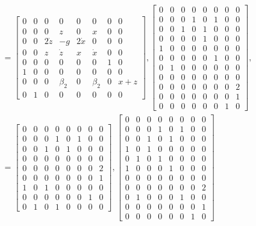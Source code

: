 \documentclass[12pt]{article}
\begin{document}
\begin{align*}
    &= 
    \left[\begin{matrix}0 & 0 & 0 & 0 & 0 & 0 & 0 & 0\\0 & 0 & 0 & z & 0 & x & 0 & 0\\0 & 0 & 2 \dot{z} & - g & 2 \dot{x} & 0 & 0 & 0\\0 & 0 & z & \dot{z} & x & \dot{x} & 0 & 0\\0 & 0 & 0 & 0 & 0 & 0 & 1 & 0\\1 & 0 & 0 & 0 & 0 & 0 & 0 & 0\\0 & 0 & 0 & \beta_{2} & 0 & \beta_{2} & 0 & x + z\\0 & 1 & 0 & 0 & 0 & 0 & 0 & 0\end{matrix}\right],
    \left[\begin{matrix}0 & 0 & 0 & 0 & 0 & 0 & 0 & 0\\0 & 0 & 0 & 1 & 0 & 1 & 0 & 0\\0 & 0 & 1 & 0 & 1 & 0 & 0 & 0\\0 & 0 & 0 & 0 & 1 & 0 & 0 & 0\\1 & 0 & 0 & 0 & 0 & 0 & 0 & 0\\0 & 0 & 0 & 0 & 0 & 1 & 0 & 0\\0 & 1 & 0 & 0 & 0 & 0 & 0 & 0\\0 & 0 & 0 & 0 & 0 & 0 & 0 & 0\\0 & 0 & 0 & 0 & 0 & 0 & 0 & 2\\0 & 0 & 0 & 0 & 0 & 0 & 0 & 1\\0 & 0 & 0 & 0 & 0 & 0 & 1 & 0\end{matrix}\right], \\
    &=
    \left[\begin{matrix}0 & 0 & 0 & 0 & 0 & 0 & 0 & 0\\0 & 0 & 0 & 1 & 0 & 1 & 0 & 0\\0 & 0 & 1 & 0 & 1 & 0 & 0 & 0\\0 & 0 & 0 & 0 & 0 & 0 & 0 & 0\\0 & 0 & 0 & 0 & 0 & 0 & 0 & 2\\0 & 0 & 0 & 0 & 0 & 0 & 0 & 1\\1 & 0 & 1 & 0 & 0 & 0 & 0 & 0\\0 & 0 & 0 & 0 & 0 & 0 & 1 & 0\\0 & 1 & 0 & 1 & 0 & 0 & 0 & 0\end{matrix}\right],
    \left[\begin{matrix}0 & 0 & 0 & 0 & 0 & 0 & 0 & 0\\0 & 0 & 0 & 1 & 0 & 1 & 0 & 0\\0 & 0 & 1 & 0 & 1 & 0 & 0 & 0\\1 & 0 & 1 & 0 & 0 & 0 & 0 & 0\\0 & 1 & 0 & 1 & 0 & 0 & 0 & 0\\1 & 0 & 0 & 0 & 1 & 0 & 0 & 0\\0 & 0 & 0 & 0 & 0 & 0 & 0 & 0\\0 & 0 & 0 & 0 & 0 & 0 & 0 & 2\\0 & 1 & 0 & 0 & 0 & 1 & 0 & 0\\0 & 0 & 0 & 0 & 0 & 0 & 0 & 1\\0 & 0 & 0 & 0 & 0 & 0 & 1 & 0\end{matrix}\right]
\end{align*}
\end{document}
